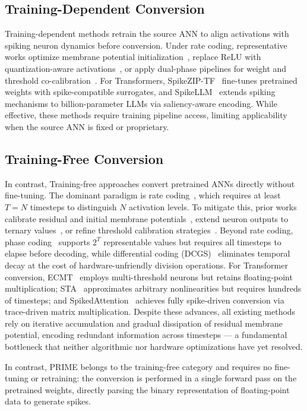 \subsection{Training-Dependent Conversion}
 
Training-dependent methods retrain the source ANN to align activations with spiking neuron dynamics before conversion. Under rate coding, representative works optimize membrane potential initialization~\cite{bu2022optimized}, replace ReLU with quantization-aware activations~\cite{bu2023optimal}, or apply dual-phase pipelines for weight and threshold co-calibration~\cite{ding2021optimal, wang2022towards}. For Transformers, SpikeZIP-TF~\cite{you2024spikezip} fine-tunes pretrained weights with spike-compatible surrogates, and SpikeLLM~\cite{xing2024spikellm} extends spiking mechanisms to billion-parameter LLMs via saliency-aware encoding. While effective, these methods require training pipeline access, limiting applicability when the source ANN is fixed or proprietary.

\subsection{Training-Free Conversion}
 
In contrast, Training-free approaches convert pretrained ANNs directly without fine-tuning. The dominant paradigm is rate coding~\cite{rueckauer2017conversion, diehl2015fast}, which requires at least $T = N$ timesteps to distinguish $N$ activation levels. To mitigate this, prior works calibrate residual and initial membrane potentials~\cite{hao2023reducing, hao2023bridging}, extend neuron outputs to ternary values~\cite{wang2022signed}, or refine threshold calibration strategies~\cite{wang2025adaptive, bu2025inference}. Beyond rate coding, phase coding~\cite{kim2018deep, wang2022efficient} supports $2^T$ representable values but requires all timesteps to elapse before decoding, while differential coding (DCGS)~\cite{huang2025differential} eliminates temporal decay at the cost of hardware-unfriendly division operations. For Transformer conversion, ECMT~\cite{huang2024towards} employs multi-threshold neurons but retains floating-point multiplication; STA~\cite{jiang2024spatio} approximates arbitrary nonlinearities but requires hundreds of timesteps; and SpikedAttention~\cite{hwang2024spikedattention} achieves fully spike-driven conversion via trace-driven matrix multiplication. 
Despite these advances, all existing methods rely on iterative accumulation and gradual dissipation of residual membrane potential, encoding redundant information across timesteps — a fundamental bottleneck that neither algorithmic nor hardware optimizations have yet resolved.

In contrast, PRIME belongs to the training-free category and requires no fine-tuning or retraining: the conversion is performed in a single forward pass on the pretrained weights, directly parsing the binary representation of floating-point data to generate spikes.